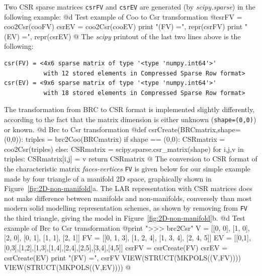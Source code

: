 \documentclass[11pt,oneside]{article}	%
\begin{document}
Two CSR sparse matrices \texttt{csrFV} and \texttt{csrEV} are generated (by \emph{scipy.sparse})  in the following example:
@d Test example of Coo to Csr transformation
@{csrFV = coo2Csr(cooFV)
csrEV = coo2Csr(cooEV)
print "\ncsr(FV) =\n", repr(csrFV)
print "\ncsr(EV) =\n", repr(csrEV)
@}
The \emph{scipy} printout of the last two lines above is the following:
{\small
\begin{verbatim}
csr(FV) = <4x6 sparse matrix of type '<type 'numpy.int64'>'
		   with 12 stored elements in Compressed Sparse Row format>
csr(EV) = <9x6 sparse matrix of type '<type 'numpy.int64'>'
		   with 18 stored elements in Compressed Sparse Row format>
\end{verbatim}}
The transformation from BRC to CSR format is implemented slightly differently, according to the fact that the matrix dimension is either unknown (\texttt{shape=(0,0)}) or known.
@d Brc to Csr transformation
@{def csrCreate(BRCmatrix,shape=(0,0)):
    triples = brc2Coo(BRCmatrix)
    if shape == (0,0):
        CSRmatrix = coo2Csr(triples)
    else:
        CSRmatrix = scipy.sparse.csr_matrix(shape)
        for i,j,v in triples: CSRmatrix[i,j] = v
    return CSRmatrix
@}
The conversion to CSR format of the characteristic matrix \emph{faces-vertices} \texttt{FV} is given below for our simple example made by four triangle of a manifold 2D space, graphically shown in Figure~\ref{fig:2D-non-manifold}a. The LAR representation with CSR matrices does not make difference between manifolds and non-manifolds, conversely than most modern solid modelling representation schemes, as shown by removing from \texttt{FV} the third triangle, giving the model in Figure~\ref{fig:2D-non-manifold}b.
@d Test example of Brc to Csr transformation
@{print "\n>>> brc2Csr"
V = [[0, 0], [1, 0], [2, 0], [0, 1], [1, 1], [2, 1]]
FV = [[0, 1, 3], [1, 2, 4], [1, 3, 4], [2, 4, 5]]
EV = [[0,1],[0,3],[1,2],[1,3],[1,4],[2,4],[2,5],[3,4],[4,5]]
csrFV = csrCreate(FV)
csrEV = csrCreate(EV)
print "\ncsrCreate(FV) =\n", csrFV
VIEW(STRUCT(MKPOLS((V,FV))))
VIEW(STRUCT(MKPOLS((V,EV))))
@}
\end{document}
